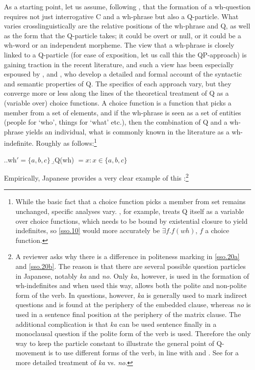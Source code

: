 \documentclass[charis]{glossa}
\begin{document}
As a starting point, let us assume, following \cite{cable:2007}, that the formation of a wh-question requires not just interrogative C and a wh-phrase but also a Q-particle. What varies crosslinguistically are the relative positions of the wh-phrase and Q, as well as the form that the Q-particle takes; it could be overt or null, or it could be a wh-word or an independent morpheme. The view that a wh-phrase is closely linked to a Q-particle (for ease of exposition, let us call this the QP-approach) is gaining traction in the recent literature, and such a view has been especially espoused by \cite{hagstrom:1998}, \cite{cable:2007} and \cite{slade:2011}, who develop a detailed and formal account of the syntactic and semantic properties of Q. The specifics of each approach vary, but they converge more or less along the lines of the theoretical treatment of Q as a (variable over) choice functions. A choice function is a function that picks a member from a set of elements, and if the wh-phrase is seen as a set of entities (people for `who', things for `what' etc.), then the combination of Q and a wh-phrase yields an individual, what is commonly known in the literature as a wh-indefinite. Roughly as follows:\footnote{While the basic fact that a choice function picks a member from set remains unchanged, specific analyses vary. \cite{cable:2007}, for example, treats Q itself as a variable over choice functions, which needs to be bound by existential closure to yield indefinites, so \ref{sso.10} would more accurately be $\exists f.f(wh)$, $f$ a choice function.}

\ex.\label{sso.10}\a.wh$' = \{a,b,c\}$
   \b.Q(wh) $= x: x \in \{a,b,c\}$

Empirically, Japanese provides a very clear example of this  \citep{hagstrom:1998}:\footnote{A reviewer asks why there is a difference in politeness marking in \ref{sso.20a} and \ref{sso.20b}. The reason is that there are several possible question particles in Japanese, notably \textit{ka} and \textit{no}. Only \textit{ka}, however, is used in the formation of wh-indefinites and when used this way, allows both the polite and non-polite form of the verb. In questions, however, \textit{ka} is generally used to mark indirect questions and is found at the periphery of the embedded clause, whereas \textit{no} is used in a sentence final position at the periphery of the matrix clause. The additional complication is that \textit{ka} can be used sentence finally in a monoclausal question if the polite form of the verb is used. Therefore the only way to keep the particle constant to illustrate the general point of Q-movement is to use different forms of the verb, in line with \cite{hagstrom:1998} and \cite{cable:2007}. See \cite{miyagawa:1987} for a more detailed treatment of \textit{ka} vs. \textit{no}.}
\end{document}
